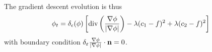 The gradient descent evolution is thus 
\begin{align}
\phi_t 
= \delta_\epsilon(\phi) \left[ 
\operatorname{div}\left(\frac{\nabla \phi}{\lvert\nabla \phi\rvert} \right) - \lambda (c_1 - f)^2 + \lambda (c_2 - f)^2 
\right]
\label{eq:acwe_el}
\end{align}
with boundary condition $\delta_\varepsilon 
\frac{\nabla \phi}{\lvert\nabla \phi\rvert} \cdot \mathbf{n} = 0$.





